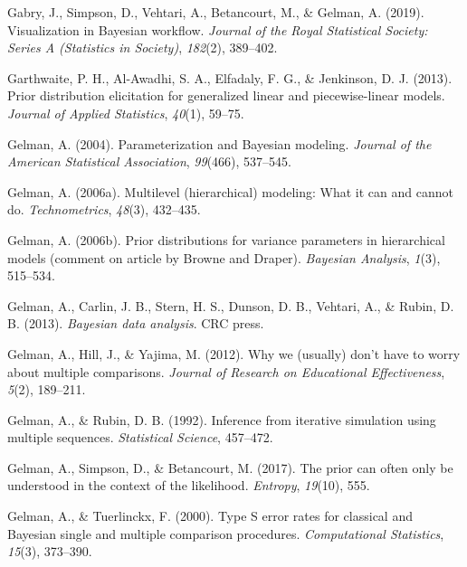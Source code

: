 \documentclass[openright,titlepage,12pt,a4paper]{book}
\begin{document}
\leavevmode\hypertarget{ref-gabry_visualization_2019}{}%
Gabry, J., Simpson, D., Vehtari, A., Betancourt, M., \& Gelman, A. (2019). Visualization in Bayesian workflow. \emph{Journal of the Royal Statistical Society: Series A (Statistics in Society)}, \emph{182}(2), 389--402.

\leavevmode\hypertarget{ref-garthwaite_prior_2013}{}%
Garthwaite, P. H., Al-Awadhi, S. A., Elfadaly, F. G., \& Jenkinson, D. J. (2013). Prior distribution elicitation for generalized linear and piecewise-linear models. \emph{Journal of Applied Statistics}, \emph{40}(1), 59--75.

\leavevmode\hypertarget{ref-gelman_parameterization_2004}{}%
Gelman, A. (2004). Parameterization and Bayesian modeling. \emph{Journal of the American Statistical Association}, \emph{99}(466), 537--545.

\leavevmode\hypertarget{ref-gelman_multilevel_2006}{}%
Gelman, A. (2006a). Multilevel (hierarchical) modeling: What it can and cannot do. \emph{Technometrics}, \emph{48}(3), 432--435.

\leavevmode\hypertarget{ref-gelman_prior_2006}{}%
Gelman, A. (2006b). Prior distributions for variance parameters in hierarchical models (comment on article by Browne and Draper). \emph{Bayesian Analysis}, \emph{1}(3), 515--534.

\leavevmode\hypertarget{ref-gelman_bayesian_2013}{}%
Gelman, A., Carlin, J. B., Stern, H. S., Dunson, D. B., Vehtari, A., \& Rubin, D. B. (2013). \emph{Bayesian data analysis}. CRC press.

\leavevmode\hypertarget{ref-gelman_why_2012}{}%
Gelman, A., Hill, J., \& Yajima, M. (2012). Why we (usually) don't have to worry about multiple comparisons. \emph{Journal of Research on Educational Effectiveness}, \emph{5}(2), 189--211.

\leavevmode\hypertarget{ref-gelman_inference_1992}{}%
Gelman, A., \& Rubin, D. B. (1992). Inference from iterative simulation using multiple sequences. \emph{Statistical Science}, 457--472.

\leavevmode\hypertarget{ref-gelman_prior_2017}{}%
Gelman, A., Simpson, D., \& Betancourt, M. (2017). The prior can often only be understood in the context of the likelihood. \emph{Entropy}, \emph{19}(10), 555.

\leavevmode\hypertarget{ref-gelman_type_2000}{}%
Gelman, A., \& Tuerlinckx, F. (2000). Type S error rates for classical and Bayesian single and multiple comparison procedures. \emph{Computational Statistics}, \emph{15}(3), 373--390.
\end{document}
